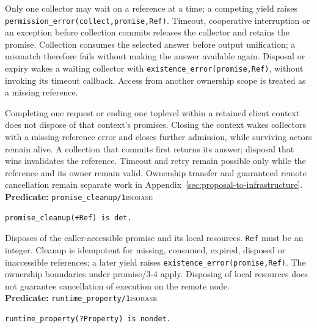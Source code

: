 Only one collector may wait on a reference at a time; a competing yield raises
\texttt{permission\_\allowbreak{}error(\allowbreak{}collect,\allowbreak{}promise,\allowbreak{}Ref)}. Timeout, cooperative interruption or an exception
before collection commits releases the collector and retains the promise. Collection consumes the
selected answer before output unification; a mismatch therefore fails without making the answer
available again. Disposal or expiry wakes a waiting collector with
\texttt{existence\_\allowbreak{}error(\allowbreak{}promise,\allowbreak{}Ref)}, without invoking its timeout callback. Access from another
ownership scope is treated as a missing reference.

Completing one request or ending one toplevel within a retained client context
does not dispose of that context's promises. Closing the context wakes
collectors with a missing-reference error and closes
further admission, while surviving actors remain alive. A collection that commits
first returns its answer; disposal that wins invalidates the reference. Timeout
and retry remain possible only while the reference and its owner remain valid.
Ownership transfer and guaranteed remote cancellation remain separate work in
Appendix~\ref{sec:proposal-to-infrastructure}.\\

\noindent \textbf{Predicate:} \texttt{promise\_\allowbreak{}cleanup/\allowbreak{}1}\hfill\textsc{isobase}
\begin{verbatim}
promise_cleanup(+Ref) is det.
\end{verbatim}

Disposes of the caller-accessible promise and its local resources. \texttt{Ref} must be an integer.
Cleanup is idempotent for missing, consumed, expired, disposed or inaccessible references; a later
yield raises \texttt{existence\_\allowbreak{}error(\allowbreak{}promise,\allowbreak{}Ref)}. The ownership boundaries under promise/3-4
apply. Disposing of local resources does not guarantee cancellation of execution on the remote node.\\


\noindent \textbf{Predicate:} \texttt{runtime\_\allowbreak{}property/\allowbreak{}1}\hfill\textsc{isobase}

\begin{verbatim}
runtime_property(?Property) is nondet.
\end{verbatim}

